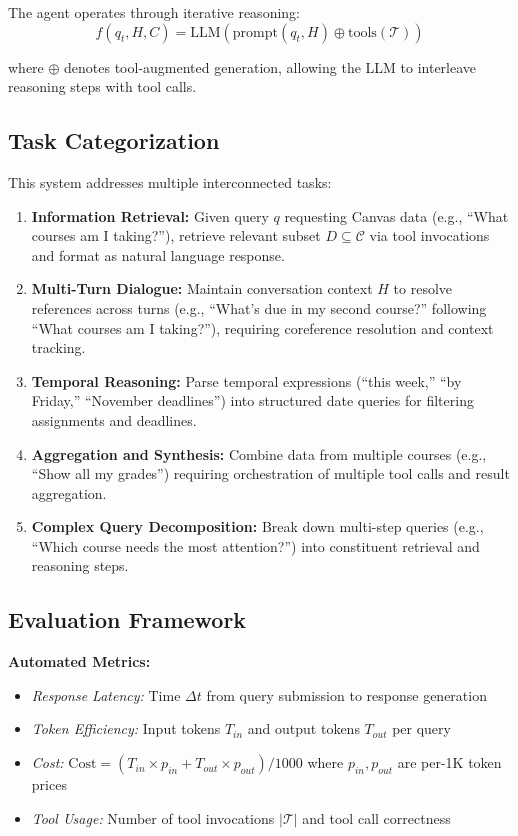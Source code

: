 \documentclass{article}
\begin{document}
The agent operates through iterative reasoning:
\begin{equation}
f(q_t, H, C) = \text{LLM}(\text{prompt}(q_t, H) \oplus \text{tools}(\mathcal{T}))
\end{equation}

where $\oplus$ denotes tool-augmented generation, allowing the LLM to interleave reasoning steps with tool calls.

\subsection{Task Categorization}

This system addresses multiple interconnected tasks:

\begin{enumerate}
\item \textbf{Information Retrieval:} Given query $q$ requesting Canvas data (e.g., ``What courses am I taking?''), retrieve relevant subset $D \subseteq \mathcal{C}$ via tool invocations and format as natural language response.

\item \textbf{Multi-Turn Dialogue:} Maintain conversation context $H$ to resolve references across turns (e.g., ``What's due in my second course?'' following ``What courses am I taking?''), requiring coreference resolution and context tracking.

\item \textbf{Temporal Reasoning:} Parse temporal expressions (``this week,'' ``by Friday,'' ``November deadlines'') into structured date queries for filtering assignments and deadlines.

\item \textbf{Aggregation and Synthesis:} Combine data from multiple courses (e.g., ``Show all my grades'') requiring orchestration of multiple tool calls and result aggregation.

\item \textbf{Complex Query Decomposition:} Break down multi-step queries (e.g., ``Which course needs the most attention?'') into constituent retrieval and reasoning steps.
\end{enumerate}

\subsection{Evaluation Framework}

\textbf{Automated Metrics:}
\begin{itemize}
\item \textit{Response Latency:} Time $\Delta t$ from query submission to response generation
\item \textit{Token Efficiency:} Input tokens $T_{in}$ and output tokens $T_{out}$ per query
\item \textit{Cost:} $\text{Cost} = (T_{in} \times p_{in} + T_{out} \times p_{out})/1000$ where $p_{in}, p_{out}$ are per-1K token prices
\item \textit{Tool Usage:} Number of tool invocations $|\mathcal{T}|$ and tool call correctness
\end{itemize}
\end{document}
